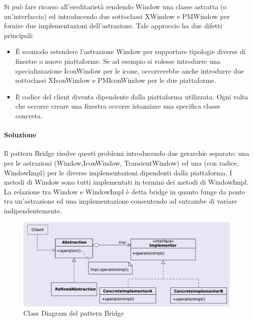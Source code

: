 Si può fare ricorso all’ereditarietà rendendo Window una classe astratta (o un’interfaccia) ed introducendo due sottoclassi XWindow e PMWindow per fornire due implementazioni dell’astrazione. Tale approccio ha due difetti principali:

\begin{itemize}
    \item È scomodo estendere l’astrazione Window per supportare tipologie diverse di finestre o nuove piattaforme. Se ad esempio si volesse introdurre una specializzazione IconWindow per le icone, occorrerebbe anche introdurre due sottoclassi XIconWindow e PMIconWindow per le due piattaforme.
    \item Il codice del client diventa dipendente dalla piattaforma utilizzata. Ogni volta che occorre creare una finestra occorre istanziare una specifica classe concreta.
\end{itemize}

\paragraph{Soluzione} Il pattern Bridge risolve questi problemi introducendo due gerarchie separate: una per le astrazioni (Window,IconWindow, TransientWindow) ed una (con radice, WindowImpl) per le diverse implementazioni dipendenti dalla piattaforma. I metodi di Window sono tutti implementati in termini dei metodi di WindowImpl. La relazione tra Window e WindowImpl è detta bridge in quanto funge da ponte tra un’astrazione ed una implementazione consentendo ad entrambe di variare indipendentemente.

\begin{figure}[H]
    \centering
    \includegraphics[width=1\linewidth]{assets/pattern/bridge/bridge-struttura.png}
    \caption{Class Diagram del pattern Bridge}
\end{figure}

